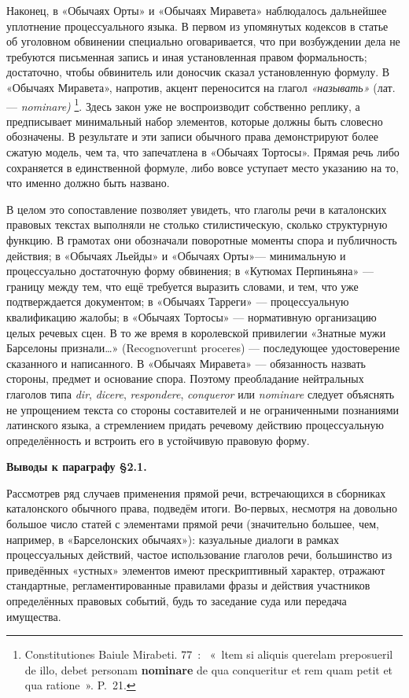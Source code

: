 Наконец, в «Обычаях Орты» и «Обычаях Миравета» наблюдалось дальнейшее уплотнение процессуального языка. В первом из упомянутых кодексов в статье об уголовном обвинении специально оговаривается, что при возбуждении дела не требуются письменная запись и иная установленная правом формальность; достаточно, чтобы обвинитель или доносчик сказал установленную формулу. В «Обычаях Миравета», напротив, акцент переносится на глагол\emph{ «называть» }(лат. ---\emph{ nominare)}\emph{\textsuperscript{ }}\footnote{Constitutiones Baiule Mirabeti. 77~:~ «~ltem si aliquis querelam preposueril de illo, debet personam \textbf{nominare}\textbf{ }de qua conqueritur et rem quam petit et qua ratione~». P.~21.}. Здесь закон уже не воспроизводит собственно реплику, а предписывает минимальный набор элементов, которые должны быть словесно обозначены. В результате и эти записи обычного права демонстрируют более сжатую модель, чем та, что запечатлена в «Обычаях Тортосы». Прямая речь либо сохраняется в единственной формуле, либо вовсе уступает место указанию на то, что именно должно быть названо.

В целом это сопоставление позволяет увидеть, что глаголы речи в каталонских правовых текстах выполняли не столько стилистическую, сколько структурную функцию. В грамотах они обозначали поворотные моменты спора и публичность действия; в «Обычаях Льейды» и «Обычаях Орты»--- минимальную и процессуально достаточную форму обвинения; в «Кутюмах Перпиньяна» --- границу между тем, что ещё требуется выразить словами, и тем, что уже подтверждается документом; в «Обычаях Тарреги» --- процессуальную квалификацию жалобы; в «Обычаях Тортосы» --- нормативную организацию целых речевых сцен. В то же время в королевской привилегии «Знатные мужи Барселоны признали…» (Recognoverunt proceres) --- последующее удостоверение сказанного и написанного. В «Обычаях Миравета» --- обязанность назвать стороны, предмет и основание спора. Поэтому преобладание нейтральных глаголов типа \emph{dir}, \emph{dicere}, \emph{respondere}, \emph{conqueror} или \emph{nominare} следует объяснять не упрощением текста со стороны составителей и не ограниченными познаниями латинского языка, а стремлением придать речевому действию процессуальную определённость и встроить его в устойчивую правовую форму.

\textbf{Выводы к параграфу §2.1}\textbf{.}

Рассмотрев ряд случаев применения прямой речи, встречающихся в сборниках каталонского обычного права, подведём итоги. Во-первых, несмотря на довольно большое число статей с элементами прямой речи (значительно большее, чем, например, в «Барселонских обычаях»): казуальные диалоги в рамках процессуальных действий, частое использование глаголов речи, большинство из приведённых «устных» элементов имеют прескриптивный характер, отражают стандартные, регламентированные правилами фразы и действия участников определённых правовых событий, будь то заседание суда или передача имущества.

